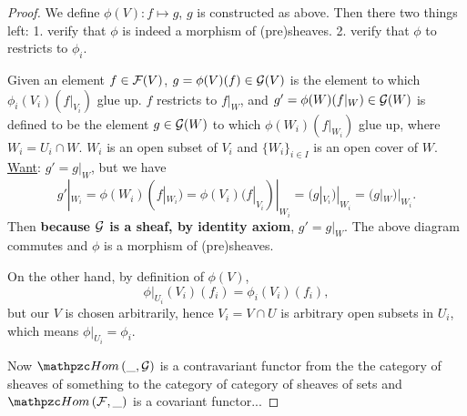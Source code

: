 \documentclass[11pt]{book} %
\begin{document}
\begin{proof}
We define $\phi(V):f\mapsto g$, $g$ is constructed as above. 
Then there two things left: 1. verify that $\phi$ is indeed a morphism of (pre)sheaves. 2. verify that $\phi$ to restricts to $\phi_i$.
\begin{center}
\end{center}
Given an element $f\in{\cal F}(V)$, $g=\phi(V)(f)\in {\cal G}(V)$ is the element to which $\phi_i(V_i)(f|_{V_i})$ glue up. $f$ restricts to $f|_W$, and $g'=\phi(W)(f|_W)\in{\cal G}(W)$ is defined to be the element $g\in {\cal G}(W)$ to which $\phi(W_i)(f|_{W_i})$ glue up, where $W_i=U_i\cap W$. $W_i$ is an open subset of $V_i$ and $\{W_i\}_{i\in I}$ is an open cover of $W$. \underline{Want}: $g'=g|_W$, but we have
$$
g'|_{W_i}=\phi(W_i)(f|_{W_i})=\phi(V_i)(f|_{V_i})|_{W_i}=(g|_{V_i})|_{W_i}
=(g|_W)|_{W_i}.
$$
Then \textbf{because ${\cal G}$ is a sheaf, by identity axiom}, $g'=g|_W$. The above diagram commutes and $\phi$ is a morphism of (pre)sheaves.

On the other hand, by definition of $\phi(V)$,
$$
\phi|_{U_i}(V_i)(f_i)=\phi_i(V_i)(f_i),
$$
but our $V$ is chosen arbitrarily, hence $V_i=V\cap U$ is arbitrary open subsets in $U_i$, which means $\phi|_{U_i}=\phi_i$.

Now $\phom(\_,\calg)$ is a contravariant functor from the the category of sheaves of something to the category of category of sheaves of sets and $\phom(\calf,\_)$ is a covariant functor...
\end{proof}
\end{document}
